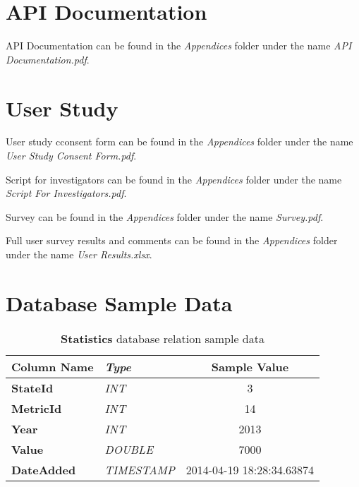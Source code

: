 \begin{appendices}

	\chapter{API Documentation} \label{app:apidoc}

		API Documentation can be found in the \emph{Appendices} folder under the
		name \emph{API Documentation.pdf}.

	\chapter{User Study} \label{app:userstudydocs}

		User study cconsent form can be found in the \emph{Appendices} folder 
		under the name \emph{User Study Consent Form.pdf}.
		
		Script for investigators can be found in the \emph{Appendices} folder 
		under the name \emph{Script For Investigators.pdf}.

		Survey can be found in the \emph{Appendices} folder under the name 
		\emph{Survey.pdf}.
		
		Full user survey results and comments can be found in the 
		\emph{Appendices} folder under the name \emph{User Results.xlsx}.

	\chapter{Database Sample Data} \label{app:dbsample}

		\begin{table}[h]
			\centering
			\begin{tabularx}{\textwidth}{@{} >{\bf}Y >{\em}l c @{}} %
				\toprule
				Column Name	& Type		& Sample Value				\\
				\midrule
				
				StateId		& INT		& 3							\\
				MetricId	& INT		& 14						\\
				Year		& INT		& 2013						\\
				Value		& DOUBLE	& 7000						\\
				DateAdded	& TIMESTAMP	& 2014-04-19 18:28:34.63874	\\
				
				\bottomrule
			\end{tabularx}
			\caption{\textbf{Statistics} database relation sample data}
			\label{tbl:statstable}
		\end{table}
		

\end{appendices}
